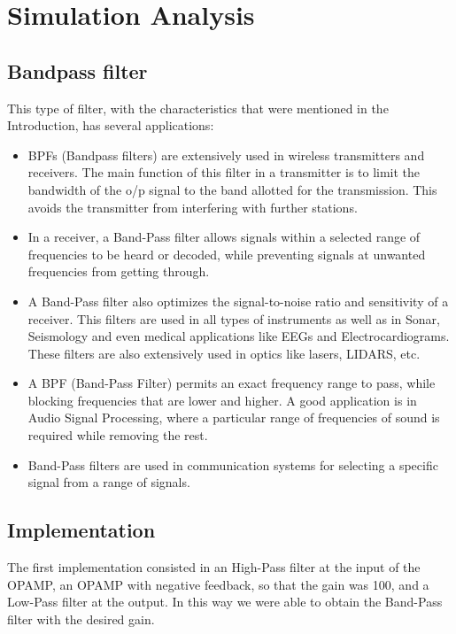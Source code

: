 \newpage
\section{Simulation Analysis}
\label{sec:simulation}


\subsection{Bandpass filter}

This type of filter, with the characteristics that were mentioned in the Introduction, has several applications:

\begin{itemize}
    \item BPFs (Bandpass filters) are extensively used in wireless transmitters and receivers. The main function of this filter in a transmitter is to limit the bandwidth of the o/p signal to the band allotted for the transmission. This avoids the transmitter from interfering with further stations.
    \item In a receiver, a Band-Pass filter allows signals within a selected range of frequencies to be heard or decoded, while preventing signals at unwanted frequencies from getting through.
    \item A Band-Pass filter also optimizes the signal-to-noise ratio and sensitivity of a receiver.
    This filters are used in all types of instruments as well as in Sonar, Seismology and even medical applications like EEGs and Electrocardiograms. These filters are also extensively used in optics like lasers, LIDARS, etc.
    \item A BPF (Band-Pass Filter) permits an exact frequency range to pass, while blocking frequencies that are lower and higher. A good application is in Audio Signal Processing, where a particular range of frequencies of sound is required while removing the rest.
    \item   Band-Pass filters are used in communication systems for selecting a specific signal from a range of signals.
\end{itemize}


\subsection{Implementation}

The first implementation consisted in an High-Pass filter at the input of the OPAMP, an OPAMP with negative feedback, so that the gain was 100, and a Low-Pass filter at the output. In this way we were able to obtain the Band-Pass filter with the desired gain. 


